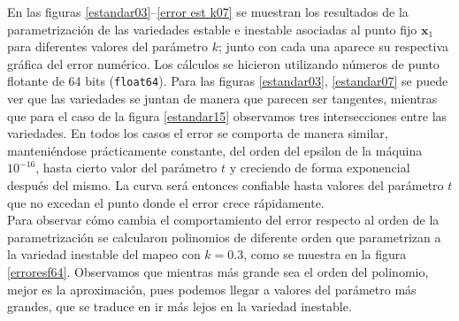 En las figuras \ref{estandar03}--\ref{error est k07} se muestran los resultados de la parametrización de las variedades estable e inestable asociadas al punto fijo $\mathbf{x}_{1}$ para diferentes valores del parámetro $k$; junto con cada una aparece su respectiva gráfica del error numérico.   Los cálculos se hicieron utilizando números de punto flotante de 64 bits (\texttt{float64}). Para las figuras \ref{estandar03}, \ref{estandar07} se puede ver que las variedades se juntan de manera que parecen ser tangentes, mientras que para el caso de la figura \ref{estandar15} observamos tres intersecciones entre las variedades. En todos los casos el error se comporta de manera similar, manteniéndose prácticamente constante, del orden del epsilon de la máquina $10^{-16}$, hasta cierto valor del parámetro $t$ y creciendo de forma exponencial después del mismo. La curva será entonces confiable hasta valores del parámetro $t$ que no excedan el punto donde el error crece rápidamente.  \\


Para observar cómo cambia el comportamiento del error respecto al orden de la parametrización se calcularon polinomios de diferente orden que parametrizan a la variedad inestable del mapeo con $k=0.3$, como se muestra en la figura \ref{erroresf64}. Observamos que mientras más grande sea el orden del polinomio, mejor es la aproximación, pues podemos llegar a valores del parámetro más grandes, que se traduce en ir más lejos en la variedad inestable. \\

